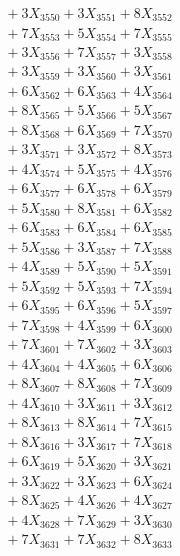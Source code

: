\documentclass[a4paper,10pt]{article}
\begin{document}
{\begin{align}
&\;  + 3 X_{3550} + 3 X_{3551} + 8 X_{3552} \\[0.3ex]
&\;  + 7 X_{3553} + 5 X_{3554} + 7 X_{3555} \\[0.3ex]
&\;  + 3 X_{3556} + 7 X_{3557} + 3 X_{3558} \\[0.3ex]
&\;  + 3 X_{3559} + 3 X_{3560} + 3 X_{3561} \\[0.3ex]
&\;  + 6 X_{3562} + 6 X_{3563} + 4 X_{3564} \\[0.3ex]
&\;  + 8 X_{3565} + 5 X_{3566} + 5 X_{3567} \\[0.3ex]
&\;  + 8 X_{3568} + 6 X_{3569} + 7 X_{3570} \\[0.3ex]
&\;  + 3 X_{3571} + 3 X_{3572} + 8 X_{3573} \\[0.3ex]
&\;  + 4 X_{3574} + 5 X_{3575} + 4 X_{3576} \\[0.3ex]
&\;  + 6 X_{3577} + 6 X_{3578} + 6 X_{3579} \\[0.5ex]\allowbreak
&\;  + 5 X_{3580} + 8 X_{3581} + 6 X_{3582} \\[0.3ex]
&\;  + 6 X_{3583} + 6 X_{3584} + 6 X_{3585} \\[0.3ex]
&\;  + 5 X_{3586} + 3 X_{3587} + 7 X_{3588} \\[0.3ex]
&\;  + 4 X_{3589} + 5 X_{3590} + 5 X_{3591} \\[0.3ex]
&\;  + 5 X_{3592} + 5 X_{3593} + 7 X_{3594} \\[0.3ex]
&\;  + 6 X_{3595} + 6 X_{3596} + 5 X_{3597} \\[0.3ex]
&\;  + 7 X_{3598} + 4 X_{3599} + 6 X_{3600} \\[0.3ex]
&\;  + 7 X_{3601} + 7 X_{3602} + 3 X_{3603} \\[0.3ex]
&\;  + 4 X_{3604} + 4 X_{3605} + 6 X_{3606} \\[0.3ex]
&\;  + 8 X_{3607} + 8 X_{3608} + 7 X_{3609} \\[0.5ex]\allowbreak
&\;  + 4 X_{3610} + 3 X_{3611} + 3 X_{3612} \\[0.3ex]
&\;  + 8 X_{3613} + 8 X_{3614} + 7 X_{3615} \\[0.3ex]
&\;  + 8 X_{3616} + 3 X_{3617} + 7 X_{3618} \\[0.3ex]
&\;  + 6 X_{3619} + 5 X_{3620} + 3 X_{3621} \\[0.3ex]
&\;  + 3 X_{3622} + 3 X_{3623} + 6 X_{3624} \\[0.3ex]
&\;  + 8 X_{3625} + 4 X_{3626} + 4 X_{3627} \\[0.3ex]
&\;  + 4 X_{3628} + 7 X_{3629} + 3 X_{3630} \\[0.3ex]
&\;  + 7 X_{3631} + 7 X_{3632} + 8 X_{3633} \\[0.3ex]

\end{align}}
\end{document}
